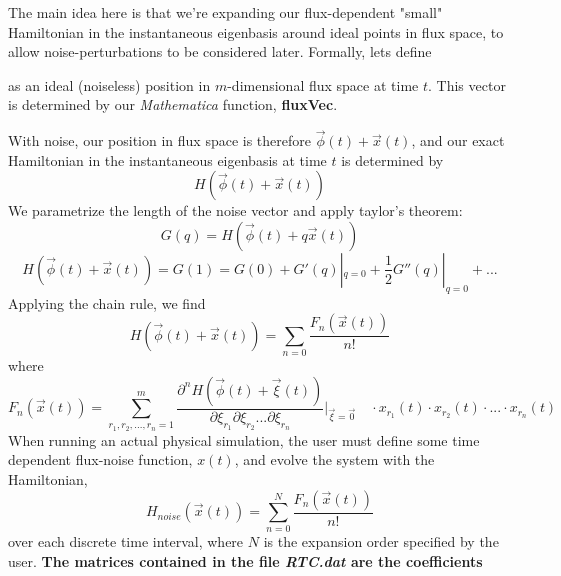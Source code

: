 \documentclass[12pt]{article}
\begin{document}
The main idea here is that we're expanding our flux-dependent "small" Hamiltonian in the instantaneous eigenbasis around ideal points in flux space, to allow noise-perturbations to be considered later. Formally, lets define

 as an ideal (noiseless) position in $m$-dimensional flux space at time $t$. This vector is determined by our \textit{Mathematica} function, \textbf{fluxVec}.

\flushleft With noise, our position in flux space is therefore $\vec{\phi}(t) + \vec{x}(t)$, and our exact Hamiltonian in the instantaneous eigenbasis at time $t$ is determined by
\begin{equation}
H(\vec{\phi}(t) + \vec{x}(t))
\end{equation}
We parametrize the length of the noise vector and apply taylor's theorem:
\begin{equation}
G(q) = H(\vec{\phi}(t) + q \vec{x}(t))
\end{equation}
\begin{equation}
H(\vec{\phi}(t) + \vec{x}(t)) = G(1) = G(0) + G'(q)|_{q=0} + \frac{1}{2} G''(q)|_{q=0}+...
\end{equation}
Applying the chain rule, we find
\begin{equation}
H(\vec{\phi}(t) + \vec{x}(t)) = \sum_{n=0} \frac{F_n(\vec{x}(t))}{n!}
\end{equation}
where
\begin{equation}
F_n(\vec{x}(t)) = \sum_{r_1,r_2,...,r_n=1}^m \frac{\partial^n H(\vec{\phi}(t)+ \vec{\xi}(t))} {\partial \xi_{r_1}\partial \xi_{r_2}...\partial \xi_{r_n}}  |_{\vec{\xi}=\vec{0}} \quad \cdot  x_{r_1}(t) \cdot x_{r_2}(t) \cdot ... \cdot x_{r_n}(t)
\end{equation}
When running an actual physical simulation, the user must define some time dependent flux-noise function, $x(t)$, and evolve the system with the Hamiltonian,
\begin{equation}
H_{noise}(\vec{x}(t)) = \sum_{n=0}^{N} \frac{F_n(\vec{x}(t))}{n!}
\end{equation}
over each discrete time interval, where $N$ is the expansion order specified by the user.
\newline
\newline
\textbf{The matrices contained in the file \textit{RTC.dat} are the coefficients}
\end{document}
